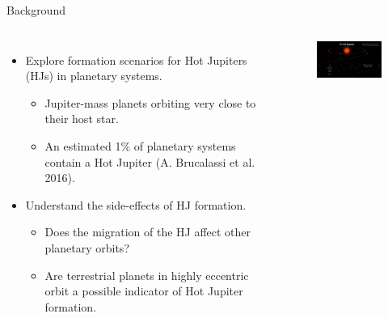 \documentclass{beamer}
\begin{document}
\begin{frame}{Background}
    \begin{columns}
        \begin{itemize}
            \item Explore formation scenarios for Hot Jupiters (HJs) in planetary
                systems.
                \begin{itemize}
                    \item Jupiter-mass planets orbiting very close to their host star.
                    \item An estimated 1\% of planetary systems contain a 
                        Hot Jupiter (A. Brucalassi et al. 2016)\footnotemark.
                \end{itemize}
            \item Understand the side-effects of HJ formation.
                \begin{itemize}
                    \item Does the migration of the HJ affect other planetary orbits?
                    \item Are terrestrial planets in highly eccentric orbit a possible
                        indicator of Hot Jupiter formation.  
                \end{itemize}
        \end{itemize} 
            \begin{figure}
                \centering
                \includegraphics[width=1.66in]{hj_orbit}
            \end{figure}
    \end{columns}

\end{frame}
\end{document}
